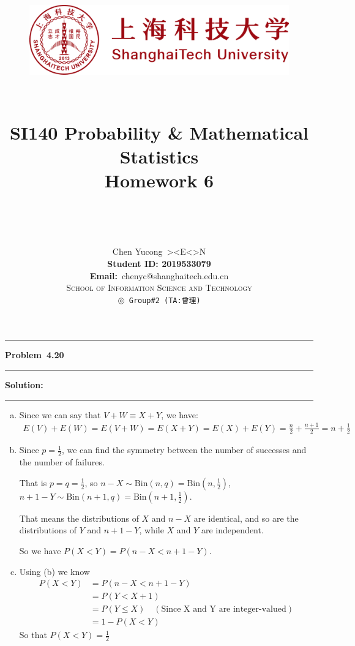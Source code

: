 \documentclass[10.5pt]{article}
\title{
	\normalfont \normalsize
	\begin{figure}[!h]
	\centering
	\includegraphics[width=4.8in, keepaspectratio]{logo_red.pdf}\\[1cm]
	\end{figure}
	\horrule{0.5pt} \\[0.4cm]
	\Huge SI140 Probability \& Mathematical Statistics\\[0.4cm]
	\LARGE Homework 6\\
	\horrule{2pt} \\[1.5cm]
}
\author{\Song{\huge\textbf{陈昱聪}}\\[0.2cm]Chen Yucong\ ><E<>N\\[4.5cm]\textbf{Student ID: 2019533079}\\[0.2cm] 
\textbf{Email:}\ {\ttfamily chenyc@shanghaitech.edu.cn}\\[0.8cm] \LARGE\textsc{School of Information Science and Technology}\\[0.63cm]
\texttt{$\circledcirc$ Group\#2\ (TA:曾理)}}
\date{}
\newcommand\question[1]{\vspace{.2in}\hrule\vspace{0.04in}\textbf{Problem\ #1}\vspace{.4em}\hrule\vspace{.10in}}
\newcommand\Solution{\vspace{.3in}\textbf{Solution:}\vspace{.5em}\hrule\vspace{.08in}\par}
\begin{document}
	
\maketitle
\thispagestyle{firstpage}
\thispagestyle{empty}
\setcounter{page}{0}

\pagebreak

\question{4.20}
	\Solution{}
	\begin{enumerate}[(a)]
		\item Since we can say that $V+W\equiv X+Y$, we have:
		\begin{align*}
			E(V)+E(W) = E(V+W) = E(X+Y) = E(X)+E(Y) = \frac{n}{2}+\frac{n+1}{2} = n+\frac{1}{2}
		\end{align*}\vspace{1cm}
		\item Since $p = \frac{1}{2}$, we can find the symmetry between the number of successes and the number of failures.
		
		That is $p = q = \frac{1}{2}$, so $n - X\sim \text{Bin}(n,q) = \text{Bin}(n,\frac{1}{2})$, $n + 1 - Y\sim \text{Bin}(n+1,q) = \text{Bin}(n+1,\frac{1}{2})$.

		That means the distributions of $X$ and $n - X$ are identical, and so are the distributions of $Y$ and $n+1-Y$, while $X$ and $Y$ are independent.

		So we have $P(X<Y) = P(n - X < n+1-Y)$.\vspace{1cm}
		\item Using (b) we know \begin{align*}
			P(X<Y) &= P(n - X<n+1-Y)\\[6pt]
			&=P(Y<X+1)\\[6pt]
			&=P(Y\leqslant X)\quad(\text{Since X and Y are integer-valued})\\[6pt]
			&=1-P(X<Y)
		\end{align*}
		So that $P(X<Y) = \frac{1}{2}$


	\end{enumerate}
   

\pagebreak
\end{document}
